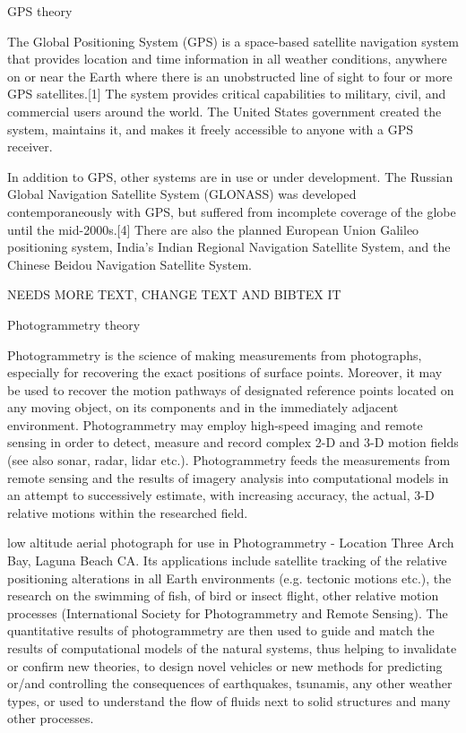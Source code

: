 GPS theory

The Global Positioning System (GPS) is a space-based satellite navigation system that provides location and time information in all weather conditions, anywhere on or near the Earth where there is an unobstructed line of sight to four or more GPS satellites.[1] The system provides critical capabilities to military, civil, and commercial users around the world. The United States government created the system, maintains it, and makes it freely accessible to anyone with a GPS receiver.

In addition to GPS, other systems are in use or under development. The Russian Global Navigation Satellite System (GLONASS) was developed contemporaneously with GPS, but suffered from incomplete coverage of the globe until the mid-2000s.[4] There are also the planned European Union Galileo positioning system, India's Indian Regional Navigation Satellite System, and the Chinese Beidou Navigation Satellite System.

NEEDS MORE TEXT, CHANGE TEXT AND BIBTEX IT

Photogrammetry theory

Photogrammetry is the science of making measurements from photographs, especially for recovering the exact positions of surface points. Moreover, it may be used to recover the motion pathways of designated reference points located on any moving object, on its components and in the immediately adjacent environment. Photogrammetry may employ high-speed imaging and remote sensing in order to detect, measure and record complex 2-D and 3-D motion fields (see also sonar, radar, lidar etc.). Photogrammetry feeds the measurements from remote sensing and the results of imagery analysis into computational models in an attempt to successively estimate, with increasing accuracy, the actual, 3-D relative motions within the researched field.


low altitude aerial photograph for use in Photogrammetry - Location Three Arch Bay, Laguna Beach CA.
Its applications include satellite tracking of the relative positioning alterations in all Earth environments (e.g. tectonic motions etc.), the research on the swimming of fish, of bird or insect flight, other relative motion processes (International Society for Photogrammetry and Remote Sensing). The quantitative results of photogrammetry are then used to guide and match the results of computational models of the natural systems, thus helping to invalidate or confirm new theories, to design novel vehicles or new methods for predicting or/and controlling the consequences of earthquakes, tsunamis, any other weather types, or used to understand the flow of fluids next to solid structures and many other processes.


